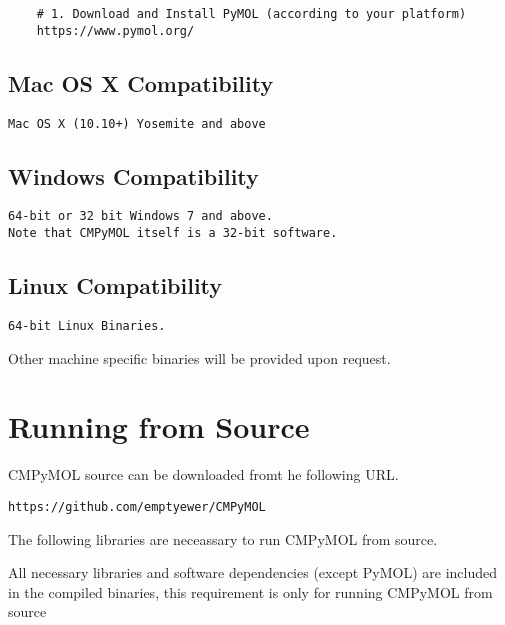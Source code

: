 \documentclass[11pt,fleqn]{book} %
\begin{document}
	\begin{lstlisting}
	# 1. Download and Install PyMOL (according to your platform)
	https://www.pymol.org/
	\end{lstlisting}

    \subsection{Mac OS X Compatibility}\label{mac_install}

    \texttt{Mac OS X (10.10+) Yosemite and above}

    \subsection{Windows Compatibility}\label{windows_install}

    \texttt{64-bit or 32 bit Windows 7 and above.\\Note that CMPyMOL itself is a 32-bit software.}

    \subsection{Linux Compatibility}\label{linux_install}

    \texttt{64-bit Linux Binaries.}

    \begin{remark}
    Other machine specific binaries will be provided upon request.
    \end{remark}

\clearpage



\section{Running from Source}

CMPyMOL source can be downloaded fromt he following URL.
\begin{lstlisting}
https://github.com/emptyewer/CMPyMOL
\end{lstlisting}

The following libraries are neceassary to run CMPyMOL from source. 

\begin{remark}
All necessary libraries and software dependencies (except PyMOL) are included in the compiled binaries, this requirement is only for running CMPyMOL from source
\end{remark}
\end{document}
